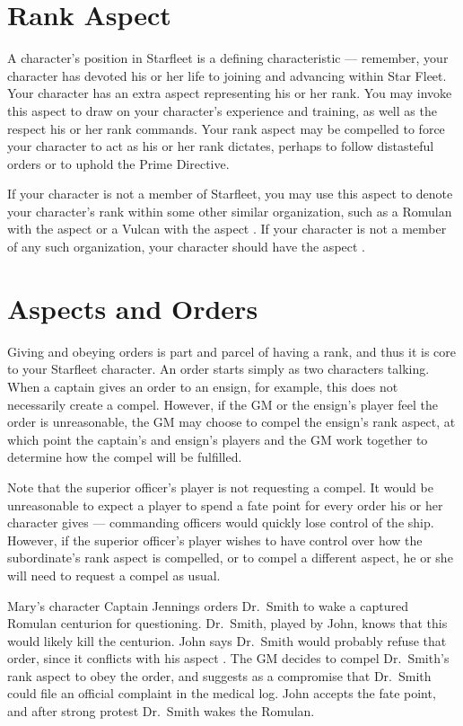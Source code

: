 \documentclass[12pt,titlepage,openany]{book}
\begin{document}
\section{Rank Aspect}\label{sec:rank}
A character's position in Starfleet is a defining characteristic --- remember,
your character has devoted his or her life to joining and advancing within Star
Fleet. Your character has an extra aspect representing his or her rank. You may
invoke this aspect to draw on your character's experience and training, as well
as the respect his or her rank commands. Your rank aspect may be compelled to
force your character to act as his or her rank dictates, perhaps to follow
distasteful orders or to uphold the Prime Directive.

If your character is not a member of Starfleet, you may use this aspect to
denote your character's rank within some other similar organization, such as a
Romulan with the aspect  or a Vulcan with the aspect
. If your character is not a member of any such
organization, your character should have the aspect .

\section{Aspects and Orders}\label{sec:aspects-orders}
Giving and obeying orders is part and parcel of having a rank, and thus it is
core to your Starfleet character. An order starts simply as two characters
talking. When a captain gives an order to an ensign, for example, this does not
necessarily create a compel. However, if the GM or the ensign's player feel the
order is unreasonable, the GM may choose to compel the ensign's rank aspect, at
which point the captain's and ensign's players and the GM work together to
determine how the compel will be fulfilled.

Note that the superior officer's player is not requesting a compel. It would be
unreasonable to expect a player to spend a fate point for every order his or
her character gives --- commanding officers would quickly lose control of the
ship. However, if the superior officer's player wishes to have control over
how the subordinate's rank aspect is compelled, or to compel a different
aspect, he or she will need to request a compel as usual.

\begin{example}
    Mary's character Captain Jennings orders Dr.\ Smith to wake a captured
    Romulan centurion for questioning. Dr.\ Smith, played by John, knows that
    this would likely kill the centurion. John says Dr.\ Smith would probably
    refuse that order, since it conflicts with his aspect .
    The GM decides to compel Dr.\ Smith's rank aspect  to
    obey the order, and suggests as a compromise that Dr.\ Smith could file an
    official complaint in the medical log. John accepts the fate point, and
    after strong protest Dr.\ Smith wakes the Romulan.
\end{example}
\end{document}
